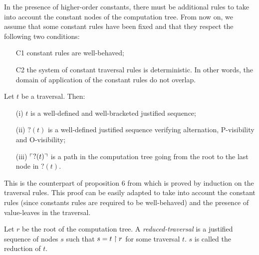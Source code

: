 In the presence of higher-order constants, there must be additional rules to take into account the
constant nodes of the computation tree.
From now on, we assume that some constant rules have been fixed and that they respect the following two conditions:
\begin{itemize}
  \item[C1] constant rules are well-behaved;
  \item[C2] the system of constant traversal rules is deterministic.  In other words, the domain of application of the
  constant rules do not overlap.
\end{itemize}


\begin{prop}
\label{prop:pviewtrav_is_path}
Let $t$ be a traversal. Then:
\begin{itemize}
\item[(i)] $t$ is a well-defined and well-bracketed justified sequence;
\item[(ii)] $?(t)$ is a well-defined justified sequence verifying alternation, P-visibility and O-visibility;
\item[(iii)] $\ulcorner ?(t) \urcorner$ is a path in the computation tree going from the root to the last node in $?(t)$.
\end{itemize}
\end{prop}
This is the counterpart of proposition 6 from \cite{OngHoMchecking2006} which is proved by induction on the traversal rules.
This proof can be easily adapted to take into account the constant rules (since constants rules are required to be well-behaved)
and the presence of value-leaves in the traversal.



\begin{dfn}
Let $r$ be the root of the computation tree. A \emph{reduced-traversal} is a justified sequence of nodes $s$ such that
$s = t \upharpoonright r$ for some traversal $t$. $s$ is called the reduction of $t$.
\end{dfn}

